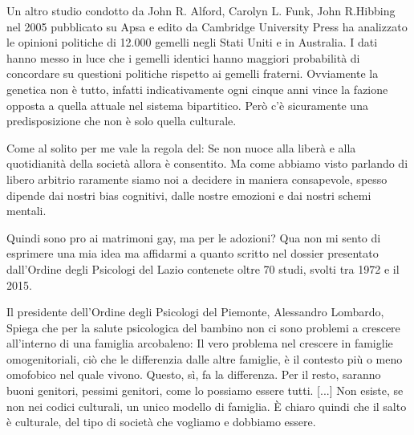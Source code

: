 \documentclass[12pt]{book} %
\begin{document}
\bigskip

Un altro studio condotto da John R. Alford, Carolyn L. Funk, John R.Hibbing nel 2005 pubblicato su Apsa e edito da
Cambridge University
Press ha analizzato le opinioni politiche di 12.000 gemelli negli Stati Uniti e in Australia. I dati hanno messo in luce
che i gemelli identici hanno maggiori probabilità di concordare su questioni politiche rispetto ai gemelli fraterni.
Ovviamente la genetica non è tutto, infatti indicativamente ogni cinque anni vince la fazione opposta a quella attuale
nel sistema bipartitico. Però c'è sicuramente una predisposizione che non è solo quella
culturale.


\bigskip

Come al solito per me vale la regola del: Se non nuoce alla liberà e alla quotidianità della società allora è
consentito. Ma come abbiamo visto parlando di libero arbitrio raramente siamo noi a decidere in maniera consapevole,
spesso dipende dai nostri bias cognitivi, dalle nostre emozioni e dai nostri schemi mentali.


\bigskip

Quindi sono pro ai matrimoni gay, ma per le adozioni? Qua non mi sento di esprimere una mia idea ma affidarmi a quanto
scritto nel
dossier presentato dall'Ordine degli Psicologi del Lazio contenete oltre 70 studi, svolti tra 1972 e il 2015. 

Il presidente dell'Ordine degli Psicologi del Piemonte, Alessandro Lombardo, Spiega che per la salute psicologica del
bambino non ci sono problemi a crescere all'interno di una famiglia arcobaleno: {\textquotedbl}Il
vero problema nel crescere in famiglie omogenitoriali, ciò che le differenzia dalle altre famiglie, è il contesto più o
meno omofobico nel quale vivono. Questo, sì, fa la differenza. Per il resto, saranno buoni genitori, pessimi genitori,
come lo possiamo essere tutti. [...] Non esiste, se non nei codici culturali, un unico modello di famiglia. È chiaro
quindi che il salto è culturale, del tipo di società che vogliamo e dobbiamo
essere.{\textquotedbl}
\end{document}
